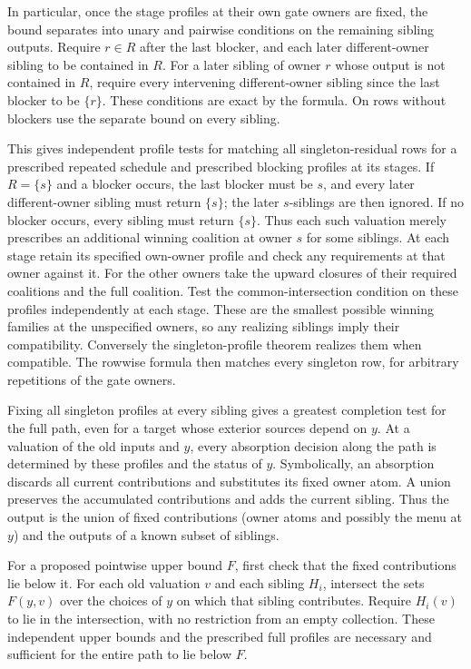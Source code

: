 In particular, once the stage profiles at their own gate
owners are fixed, the bound separates into unary and pairwise
conditions on the remaining sibling outputs. Require $r\in R$
after the last blocker, and each later different-owner sibling
to be contained in $R$. For a later sibling of owner $r$ whose
output is not contained in $R$, require every intervening
different-owner sibling since the last blocker to be $\{r\}$.
These conditions are exact by the formula. On rows without
blockers use the separate bound on every sibling.

This gives independent profile tests for matching all
singleton-residual rows for a prescribed repeated schedule
and prescribed blocking profiles at its stages. If $R=\{s\}$
and a blocker occurs, the last blocker must be $s$, and every
later different-owner sibling must return $\{s\}$; the later
$s$-siblings are then ignored. If no blocker occurs, every
sibling must return $\{s\}$. Thus each such valuation merely
prescribes an additional winning coalition at owner $s$ for
some siblings. At each stage retain its specified own-owner
profile and check any requirements at that owner against it.
For the other owners take the upward closures of their required
coalitions and the full coalition. Test the common-intersection
condition on these profiles independently at each stage. These
are the smallest possible winning families at the unspecified
owners, so any realizing siblings imply their compatibility.
Conversely the singleton-profile theorem realizes them when
compatible. The rowwise formula then matches every singleton
row, for arbitrary repetitions of the gate owners.

Fixing all singleton profiles at every sibling gives a greatest
completion test for the full path, even for a target whose
exterior sources depend on $y$. At a valuation of the old inputs
and $y$, every absorption decision along the path is determined
by these profiles and the status of $y$. Symbolically, an
absorption discards all current contributions and substitutes
its fixed owner atom. A union preserves the accumulated
contributions and adds the current sibling. Thus the output
is the union of fixed contributions (owner atoms and possibly
the menu at $y$) and the outputs of a known subset of siblings.

For a proposed pointwise upper bound $F$, first check that
the fixed contributions lie below it. For each old valuation
$v$ and each sibling $H_i$, intersect the sets $F(y,v)$ over
the choices of $y$ on which that sibling contributes. Require
$H_i(v)$ to lie in the intersection, with no restriction from
an empty collection. These independent upper bounds and the
prescribed full profiles are necessary and sufficient for
the entire path to lie below $F$.

